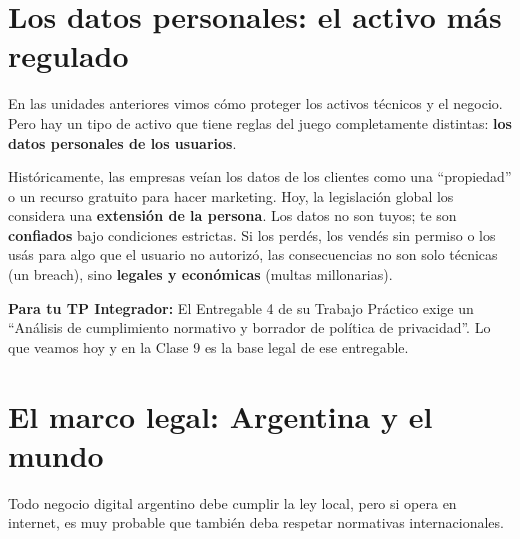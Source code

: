 \documentclass[12pt,a4paper]{article}
\begin{document}
\tableofcontents
\newpage

\section{Los datos personales: el activo m\'as regulado}

En las unidades anteriores vimos c\'omo proteger los activos t\'ecnicos y el negocio. Pero hay un tipo de activo que tiene reglas del juego completamente distintas: \textbf{los datos personales de los usuarios}.

\begin{cajaConcepto}[title={El cambio de paradigma}]
Hist\'oricamente, las empresas ve\'ian los datos de los clientes como una ``propiedad'' o un recurso gratuito para hacer marketing. Hoy, la legislaci\'on global los considera una \textbf{extensi\'on de la persona}. Los datos no son tuyos; te son \textbf{confiados} bajo condiciones estrictas. Si los perd\'es, los vend\'es sin permiso o los us\'as para algo que el usuario no autoriz\'o, las consecuencias no son solo t\'ecnicas (un breach), sino \textbf{legales y econ\'omicas} (multas millonarias).
\end{cajaConcepto}

\begin{cajaNota}
\textbf{Para tu TP Integrador:} El Entregable 4 de su Trabajo Pr\'actico exige un ``An\'alisis de cumplimiento normativo y borrador de pol\'itica de privacidad''. Lo que veamos hoy y en la Clase 9 es la base legal de ese entregable.
\end{cajaNota}

\newpage
\section{El marco legal: Argentina y el mundo}

Todo negocio digital argentino debe cumplir la ley local, pero si opera en internet, es muy probable que tambi\'en deba respetar normativas internacionales.
\end{document}
